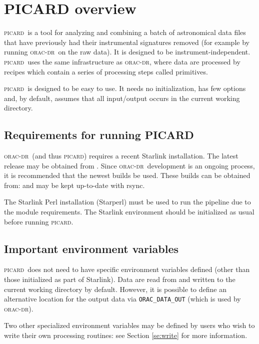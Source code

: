\documentclass[twoside,11pt,nolof]{starlink}
\providecommand{\oracdr}{\textsc{orac-dr}}
\providecommand{\picard}{\textsc{picard}}
\begin{document}
\section{PICARD overview\label{se:picard}}

\picard\ is a tool for analyzing and combining a batch of astronomical
data files that have previously had their instrumental signatures
removed (for example by running \oracdr\ on the raw data). It is
designed to be instrument-independent. \picard\ uses the same
infrastructure as \oracdr, where data are processed by recipes which
contain a series of processing steps called primitives.

\picard\ is designed to be easy to use. It needs no initialization,
has few options and, by default, assumes that all input/output occurs
in the current working directory.

\subsection{Requirements for running PICARD}

\oracdr\ (and thus \picard) requires a recent Starlink
installation. The latest release may be obtained from
. Since
\oracdr\ development is an ongoing process, it is recommended that the
newest builds be used. These builds can be obtained from:
and may be kept up-to-date with rsync.

The Starlink Perl installation (Starperl) must be used to run the
pipeline due to the module requirements. The Starlink environment
should be initialized as usual before running \picard.

\subsection{Important environment variables}

\picard\ does not need to have specific environment variables defined
(other than those initialized as part of Starlink). Data are read from
and written to the current working directory by default. However, it
is possible to define an alternative location for the output data via
\verb+ORAC_DATA_OUT+ (which is used by \oracdr).

Two other specialized environment variables may be defined by users
who wish to write their own processing routines: see Section
\ref{se:write} for more information.
\end{document}
